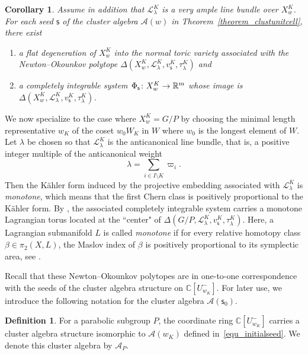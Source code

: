 \documentclass[11pt]{amsart}
\newcommand{\C}{\mathbb{C}}
\newcommand{\R}{\mathbb{R}}
\def\mcal{\mathcal}
\numberwithin{equation}{section}
\theoremstyle{plain}
\newtheorem{corollary}[theorem]{Corollary}
\theoremstyle{definition}
\newtheorem{definition}[theorem]{Definition}
\def\to{\mathchoice{\longrightarrow}{\rightarrow}{\rightarrow}{\rightarrow}}
\numberwithin{equation}{section}
\newcommand{\seed}{\mathsf{s}}
\begin{document}
\begin{corollary}\label{cor_constructiontoric}
Assume in addition that $\mcal{L}^K_\lambda$ is a very ample line bundle over $X_w^K$. For each seed $\seed$ of the cluster algebra $\mcal{A}(w)$ in Theorem~\ref{theorem_clustunitcell}, there exist
\begin{enumerate}
\item a flat degeneration of $X_w^K$ into the normal toric variety associated with the Newton--Okounkov polytope $\Delta(X_w^K, \mcal{L}^K_\lambda, v^K_{\seed}, \tau^K_\lambda)$ and
\item a completely integrable system $\Phi_\seed \colon X_w^K \to \R^{m}$ whose image is $\Delta(X_w^K, \mcal{L}^K_\lambda, v^K_{\seed}, \tau^K_\lambda)$.
\end{enumerate}
\end{corollary}

We now specialize to the case where $X_w^K = G/P$ by choosing the minimal length representative $w_K$ of the coset $w_0 W_K$ in $W$ where $w_0$ is the longest element of $W$. Let $\lambda$ be chosen so that $\mathcal{L}^K_\lambda$ is the anticanonical line bundle, that is, a positive integer multiple of the anticanonical weight 
$$
\lambda = \sum_{i \in I \setminus K} \varpi_i.
$$ 
Then the K\"{a}hler form induced by the projective embedding associated with $\mcal{L}^K_\lambda$ is \emph{monotone}, which means that the first Chern class is positively proportional to the K\"{a}hler form. By \cite[Proposition A]{CKKP25}, the associated completely integrable system carries a monotone Lagrangian torus located at the ``center" of $\Delta(G/P, \mcal{L}^K_\lambda, v^K_{\seed}, \tau^K_\lambda)$. Here, a Lagrangian submanifold $L$ is called \emph{monotone} if for every relative homotopy class $\beta \in \pi_2(X,L)$, the Maslov index of $\beta$ is positively proportional to its symplectic area, see \cite{Oh93, BC09}.

Recall that these Newton--Okounkov polytopes are in one-to-one correspondence with the seeds of the cluster algebra structure on $\C[U^-_{w_K}]$. For later use, we introduce the following notation for the cluster algebra $\mcal{A}(\seed_0)$.

\begin{definition}\label{def_clusteralgforpartialflag}
For a parabolic subgroup $P$, the coordinate ring $\C[U^-_{w_K}]$ carries a cluster algebra structure isomorphic to $\mcal{A}(w_K)$ defined in~\eqref{equ_initialseed}. We denote this cluster algebra by $\mcal{A}_P$. 
\end{definition}
\end{document}
